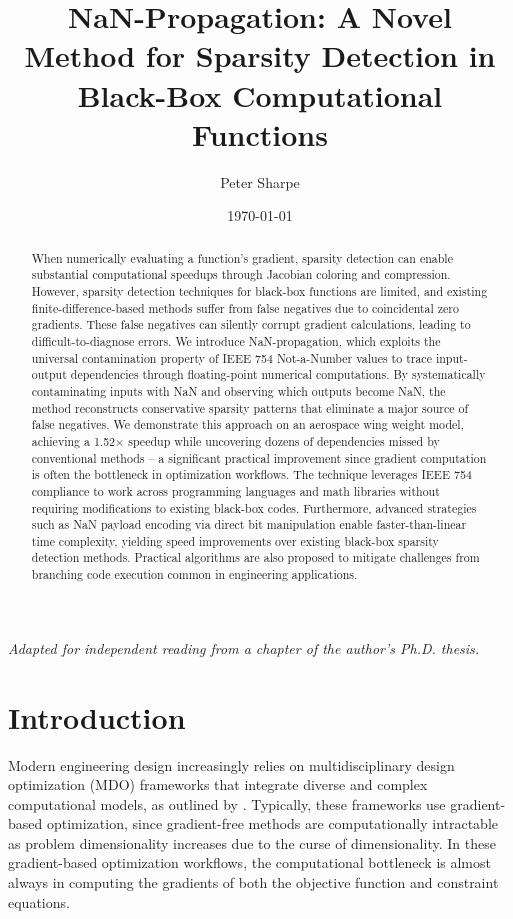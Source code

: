 \documentclass{article}
\title{NaN-Propagation: A Novel Method for Sparsity Detection in Black-Box Computational Functions}
\author{Peter Sharpe}
\affil{Massachusetts Institute of Technology}
\date{\today}
\begin{document}
\maketitle

\begin{abstract}

    When numerically evaluating a function's gradient, sparsity detection can enable substantial computational speedups through Jacobian coloring and compression. However, sparsity detection techniques for black-box functions are limited, and existing finite-difference-based methods suffer from false negatives due to coincidental zero gradients. These false negatives can silently corrupt gradient calculations, leading to difficult-to-diagnose errors. We introduce NaN-propagation, which exploits the universal contamination property of IEEE 754 Not-a-Number values to trace input-output dependencies through floating-point numerical computations. By systematically contaminating inputs with NaN and observing which outputs become NaN, the method reconstructs conservative sparsity patterns that eliminate a major source of false negatives. We demonstrate this approach on an aerospace wing weight model, achieving a 1.52× speedup while uncovering dozens of dependencies missed by conventional methods -- a significant practical improvement since gradient computation is often the bottleneck in optimization workflows. The technique leverages IEEE 754 compliance to work across programming languages and math libraries without requiring modifications to existing black-box codes. Furthermore, advanced strategies such as NaN payload encoding via direct bit manipulation enable faster-than-linear time complexity, yielding speed improvements over existing black-box sparsity detection methods. Practical algorithms are also proposed to mitigate challenges from branching code execution common in engineering applications.

\end{abstract}

\begin{center}
    \small\textit{Adapted for independent reading from a chapter of the author's Ph.D. thesis.}
\end{center}

\section{Introduction}

Modern engineering design increasingly relies on multidisciplinary design optimization (MDO) frameworks that integrate diverse and complex computational models, as outlined by \cite{martinsEngineeringDesignOptimization2021}. Typically, these frameworks use gradient-based optimization, since gradient-free methods are computationally intractable as problem dimensionality increases due to the curse of dimensionality. In these gradient-based optimization workflows, the computational bottleneck is almost always in computing the gradients of both the objective function and constraint equations.
\end{document}
